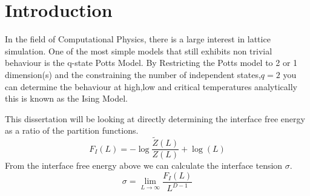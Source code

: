 \chapter{Introduction}
In the field of Computational Physics, there is a large interest in lattice simulation.
One of the most simple models that still exhibits non trivial behaviour is the q-state Potts Model.
By Restricting the Potts model to 2 or 1 dimension(s) and the constraining the number of independent states,$q = 2$ you can determine the behaviour at high,low and critical temperatures analytically\cite{Montroll1963} this is known as the Ising Model.

This dissertation will be looking at directly determining the interface free energy as a ratio of the partition functions.
\begin{equation}
F_{I}(L) = -\log \frac{\tilde{Z}(L)}{Z(L)} + \log(L)
\end{equation}
From the interface free energy above we can calculate the interface tension $\sigma$.
\begin{equation}
\sigma = \lim_{L\to \infty} \frac{F_{I}(L)}{L^{D-1}}
\end{equation}